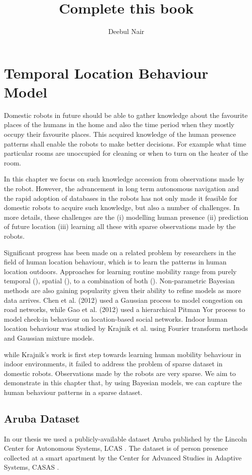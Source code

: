 \documentclass[11pt]{report}
\title{\textbf{Complete this book }}
\author{Deebul Nair}
\date{}
\begin{document}
\chapter{Temporal Location Behaviour Model}

Domestic robots in future should be able to gather knowledge about the favourite places of the humans in the home and also the time period when they mostly occupy their favourite places. This acquired knowledge of the human presence patterns shall enable the robots to make better decisions. For example what time particular rooms are unoccupied for cleaning or when to turn on the heater of the room. 

In this chapter we focus on such knowledge accession from observations made by the robot. However, the advancement in long term autonomous navigation  and the rapid adoption of databases in the robots  has not only made it feasible for domestic robots to acquire such knowledge, but also a number of challenges.  In more details, these challenges are the (i) modelling human presence (ii) prediction of future location (iii) learning all these with sparse observations made by the robots. 

Significant progress has been made on a related problem by researchers in the field of human location behaviour, which is to learn the patterns in human location outdoors. Approaches for learning routine mobility  range from purely temporal (\cite{c1, c2}), spatial (\cite{c5,c3}), to a combination  of  both  (\cite{c4}). Non-parametric Bayesian methods are also gaining popularity given their ability to refine models as more data arrives. Chen et al. (2012) used a Gaussian process to model congestion on road networks, while Gao et al. (2012) used a hierarchical Pitman Yor process to model check-in behaviour on location-based social networks. Indoor human location behaviour was studied by Krajnik et al.  using Fourier transform methods and Gaussian mixture models. 

while Krajnik's  work is first step towards learning human mobility behaviour in indoor environments, it failed to address the problem of sparse dataset in domestic robots. Observations made by the robots are very sparse. We aim to demonstrate in this chapter that, by using Bayesian models, we can capture the human behaviour patterns in a sparse dataset.






\section{Aruba Dataset}
In our thesis we used a  publicly-available  dataset  Aruba published by the Lincoln Center for Autonomous Systems, LCAS . The dataset is of person presence collected at a smart apartment by the Center for Advanced Studies in Adaptive Systems, CASAS .
\end{document}
